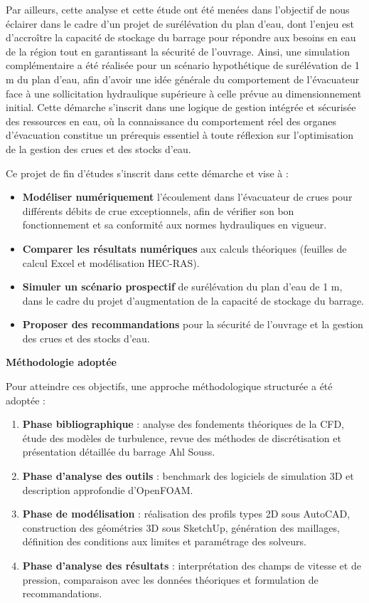 {Par ailleurs, cette analyse et cette étude ont été menées dans l'objectif de nous éclairer dans le cadre d'un projet de surélévation du plan d'eau, dont l'enjeu est d'accroître la capacité de stockage du barrage pour répondre aux besoins en eau de la région tout en garantissant la sécurité de l'ouvrage. Ainsi, une simulation complémentaire a été réalisée pour un scénario hypothétique de surélévation de 1 m du plan d'eau, afin d'avoir une idée générale du comportement de l'évacuateur face à une sollicitation hydraulique supérieure à celle prévue au dimensionnement initial. Cette démarche s'inscrit dans une logique de gestion intégrée et sécurisée des ressources en eau, où la connaissance du comportement réel des organes d'évacuation constitue un prérequis essentiel à toute réflexion sur l'optimisation de la gestion des crues et des stocks d'eau.

Ce projet de fin d'études s'inscrit dans cette démarche et vise à :
\begin{itemize}
    \item \textbf{Modéliser numériquement} l'écoulement dans l'évacuateur de crues pour différents débits de crue exceptionnels, afin de vérifier son bon fonctionnement et sa conformité aux normes hydrauliques en vigueur.
    \item \textbf{Comparer les résultats numériques} aux calculs théoriques (feuilles de calcul Excel et modélisation HEC-RAS).
    \item \textbf{Simuler un scénario prospectif} de surélévation du plan d'eau de 1 m, dans le cadre du projet d'augmentation de la capacité de stockage du barrage.
    \item \textbf{Proposer des recommandations} pour la sécurité de l'ouvrage et la gestion des crues et des stocks d'eau.
\end{itemize}

\textbf{Méthodologie adoptée}

Pour atteindre ces objectifs, une approche méthodologique structurée a été adoptée :
\begin{enumerate}
    \item \textbf{Phase bibliographique} : analyse des fondements théoriques de la CFD, étude des modèles de turbulence, revue des méthodes de discrétisation et présentation détaillée du barrage Ahl Souss.
    \item \textbf{Phase d'analyse des outils} : benchmark des logiciels de simulation 3D et description approfondie d'OpenFOAM.
    \item \textbf{Phase de modélisation} : réalisation des profils types 2D sous AutoCAD, construction des géométries 3D sous SketchUp, génération des maillages, définition des conditions aux limites et paramétrage des solveurs.
    \item \textbf{Phase d'analyse des résultats} : interprétation des champs de vitesse et de pression, comparaison avec les données théoriques et formulation de recommandations.
\end{enumerate}

}
\newpage
